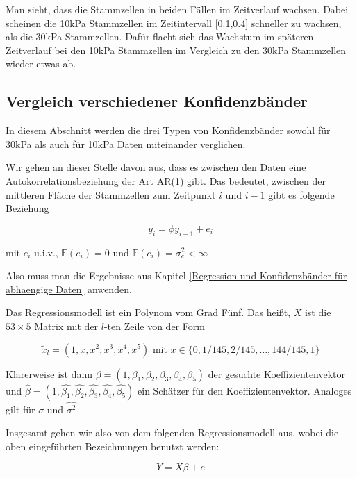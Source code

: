\documentclass[12pt,a4paper]{article}
\theoremstyle{definition}
\theoremstyle{definition}
\theoremstyle{definition}
\theoremstyle{definition}
\begin{document}
Man sieht, dass die Stammzellen in beiden Fällen im Zeitverlauf wachsen. Dabei scheinen die 10kPa Stammzellen im Zeitintervall [0.1,0.4] schneller zu wachsen, als die 30kPa Stammzellen. Dafür flacht sich das Wachstum im späteren Zeitverlauf bei den 10kPa Stammzellen im Vergleich zu den 30kPa Stammzellen wieder etwas ab.



\subsection{Vergleich verschiedener Konfidenzbänder}
In diesem Abschnitt werden die drei Typen von Konfidenzbänder sowohl für 30kPa als auch für 10kPa Daten miteinander verglichen. 

Wir gehen an dieser Stelle davon aus, dass es zwischen den Daten eine Autokorrelationsbeziehung der Art AR(1) gibt. Das bedeutet, zwischen der mittleren Fläche der Stammzellen zum Zeitpunkt $i$ und $i-1$ gibt es folgende Beziehung

\begin{equation*}
y_i = \phi y_{i-1} + e_i
\end{equation*}

mit $e_i$ u.i.v., $\mathbb{E}(e_i)=0$ und $\mathbb{E}(e_i) = \sigma_e^2 < \infty$

Also muss man die Ergebnisse aus Kapitel \ref{Regression und Konfidenzbänder für abhaengige Daten} anwenden.

Das Regressionsmodell ist ein Polynom vom Grad Fünf. Das heißt, $X$ ist die $53 \times 5$ Matrix mit der $l$-ten Zeile von der Form 

\begin{equation*}
\tilde{x}_l = (1, x, x^2, x^3, x^4, x^5 ) \text{ mit } x \in \{0, 1/145, 2/145, \ldots, 144/145, 1 \}
\end{equation*}

Klarerweise ist dann $\beta = (1, \beta_1, \beta_2, \beta_3, \beta_4, \beta_5)$ der gesuchte Koeffizientenvektor und $\hat{\beta} = (1, \hat{\beta_1}, \hat{\beta_2}, \hat{\beta_3}, \hat{\beta_4}, \hat{\beta_5})$ ein Schätzer für den Koeffizientenvektor. Analoges gilt für $\sigma$ und $\widehat{\sigma^2}$

Insgesamt gehen wir also von dem folgenden Regressionsmodell aus, wobei die oben eingeführten Bezeichnungen benutzt werden:

\begin{equation*}
Y = X \beta + e
\end{equation*}
\end{document}
